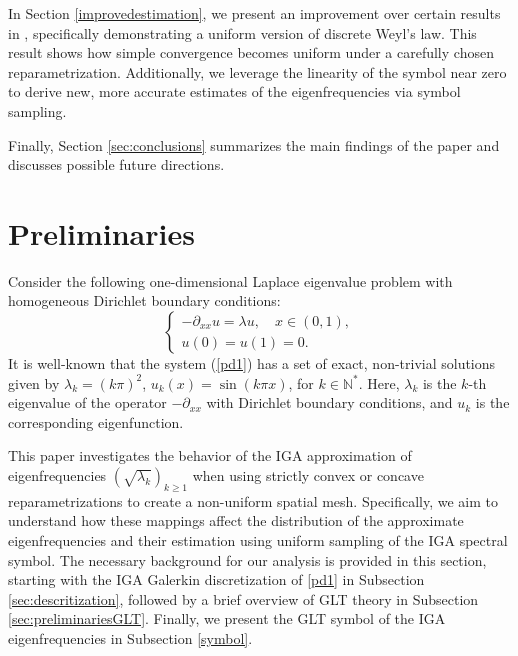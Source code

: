 \documentclass[11pt]{article}
\begin{document}
In Section \ref{improvedestimation}, we present an improvement over certain results in \cite{bianchi2021analysis}, specifically demonstrating a uniform version of discrete Weyl’s law. This result shows how simple convergence becomes uniform under a carefully chosen reparametrization. Additionally, we leverage the linearity of the symbol near zero to derive new, more accurate estimates of the eigenfrequencies via symbol sampling.  

Finally, Section \ref{sec:conclusions} summarizes the main findings of the paper and discusses possible future directions.  


\section{Preliminaries}\label{sec:preliminaries}
Consider the following one-dimensional Laplace eigenvalue problem with homogeneous Dirichlet boundary conditions:
\begin{equation}\label{pd1}
\left\{
\begin{array}{ll}
 -\partial_{xx}u=\lambda u,\quad x\in (0,1),\\
 u(0)=u(1)=0.
\end{array}
\right.
\end{equation}
It is well-known that the system (\ref{pd1})  has a set of exact, non-trivial solutions given by $\lambda_k = \left( k\pi\right)^2$, $u_k(x) = \sin(k\pi x)$, for $k \in \mathbb{N}^*$. Here, $\lambda_k$ is the $k$-th eigenvalue of the operator $-\partial_{xx}$ with Dirichlet boundary conditions, and $u_k$ is the corresponding eigenfunction.  

This paper investigates the behavior of the IGA approximation of eigenfrequencies $(\sqrt{\lambda_k})_{k\geq1}$ when using strictly convex or concave reparametrizations to create a non-uniform spatial mesh. Specifically, we aim to understand how these mappings affect the distribution of the approximate eigenfrequencies and their estimation using uniform sampling of the IGA spectral symbol. The necessary background for our analysis is provided in this section, starting with the IGA Galerkin discretization of \eqref{pd1} in Subsection \ref{sec:descritization}, followed by a brief overview of GLT theory in Subsection \ref{sec:preliminariesGLT}.  Finally, we present the GLT symbol of the IGA eigenfrequencies in Subsection \ref{symbol}.  
\end{document}
